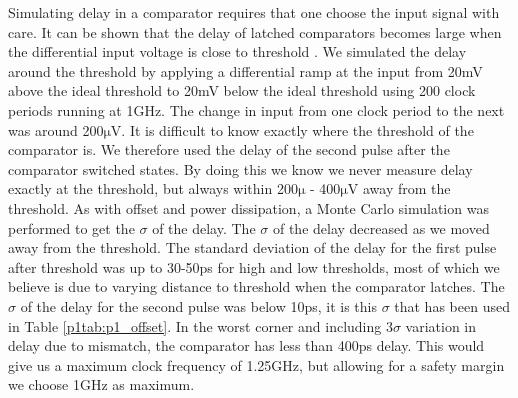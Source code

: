 Simulating delay in a comparator requires that one choose the input
signal with care. It can be shown that the delay of latched comparators
becomes large when the differential input voltage is close to threshold
\cite{johns}. We simulated the delay around the threshold by applying a
differential ramp at the input from 20mV above the ideal threshold to
20mV below the ideal threshold using 200 clock periods running at 1GHz.
The change in input from one clock period to the next was around
200\begin{math}\mathrm{\mu}\end{math}V. It is difficult to know exactly
where the threshold of the comparator is. We therefore used the delay
of the second pulse after the comparator switched states. By doing this
we know we never measure delay exactly at the threshold, but always
within 200\begin{math}\mathrm{\mu}\end{math} -
400\begin{math}\mathrm{\mu}\end{math}V away from the threshold. As with
offset and power dissipation, a Monte Carlo simulation was performed to
get the \begin{math}\sigma{}\end{math} of the delay. The
\begin{math}\sigma{}\end{math} of the delay decreased as we moved away
from the threshold. The standard deviation of the delay for the first
pulse after threshold was up to 30-50ps for high and low thresholds,
most of which we believe is due to varying distance to threshold when
the comparator latches. The \begin{math}\sigma{}\end{math} of the delay
for the second pulse was below 10ps, it is this
\begin{math}\sigma{}\end{math} that has been used in Table  \ref{p1tab:p1_offset}. In the
worst corner and including 3\begin{math}\sigma{}\end{math} variation in
delay due to mismatch, the comparator has less than 400ps delay. This
would give us a maximum clock frequency of 1.25GHz, but allowing for a
safety margin we choose 1GHz as maximum.
 


